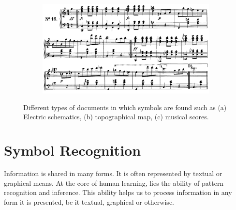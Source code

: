 \begin{figure}[h]
\begin{subfigure}[b]{0.4\textwidth}
        \caption{}
        \label{fig:map}
    \end{subfigure}
        \begin{subfigure}[b]{0.4\textwidth}
        \centering
        \includegraphics[width=1\textwidth]{figures/LitreatureReview/score2.png}
        \caption{}
        \label{fig:score}
    \end{subfigure}
    
    \caption[Example of symbol holding documents]{Different types of documents in which symbols are found such as (a) Electric schematics\footnotemark, (b) topographical map\footnotemark, (c) musical scores\footnotemark.}
    \label{fig:documentexamples}
\end{figure}

\vspace{19mm}


\section{Symbol Recognition}
Information is shared in many forms. It is often represented by textual or graphical means. At the core of human learning, lies the ability of pattern recognition and inference. This ability helps us to process information in any form it is presented, be it textual, graphical or otherwise. \\

